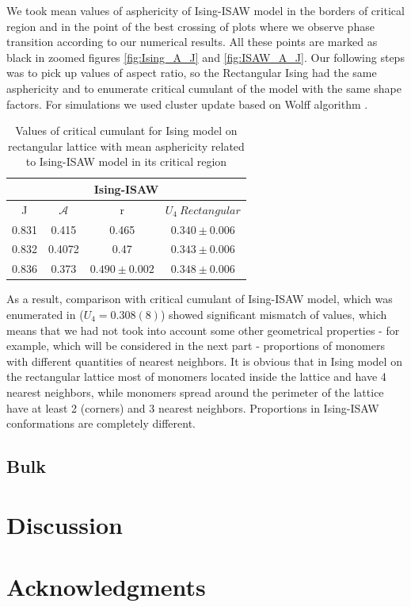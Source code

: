 \documentclass[aps,pre,amssymb,amsmath,twocolumn,floatfix]{revtex4-2}
\begin{document}
We took mean values of asphericity of Ising-ISAW model in the borders of critical region and in the point of the best crossing of plots where we observe phase transition according to our numerical results. All these points are marked as black in zoomed figures \ref{fig:Ising_A_J} and \ref{fig:ISAW_A_J}. Our following steps was to pick up values of aspect ratio, so the Rectangular Ising had the same asphericity and to enumerate critical cumulant of the model with the same shape factors. For simulations we used cluster update based on Wolff algorithm \cite{newmanb99}.\\

\begin{table}[h]
    \centering
    \begin{tabular}{|c|c|c|c|}
        \hline
         \multicolumn{4}{|c|}{Ising-ISAW}  \\ \hline
         J & $\mathcal{A}$ & r & $U_{4}\  Rectangular$ \\ \hline
         0.831 & 0.415 & 0.465 & $0.340 \pm 0.006$\\ \hline
         0.832 & 0.4072 & 0.47 & $0.343 \pm 0.006$\\ \hline
         0.836 & 0.373 & $0.490 \pm 0.002$ & $0.348 \pm 0.006$\\ \hline
         \end{tabular}
    \caption{Values of critical cumulant for Ising model on rectangular lattice with mean asphericity related to Ising-ISAW model in its critical region}
    \label{tab:A_r_U}
\end{table}


As a result, comparison with critical cumulant of Ising-ISAW model, which was enumerated in \cite{faizullina2021critical} ($U_{4} = 0.308(8)$) showed significant mismatch of values, which means that we had not took into account some other geometrical properties - for example, which will be considered in the next part - proportions of monomers with different quantities of nearest neighbors. It is obvious that in Ising model on the rectangular lattice most of monomers located inside the lattice and have 4 nearest neighbors, while monomers spread around the perimeter of the lattice have at least 2 (corners) and 3 nearest neighbors. Proportions in Ising-ISAW conformations are completely different.

\subsection{Bulk}

\section{Discussion}

\section{Acknowledgments}


\end{document}
